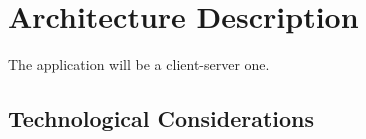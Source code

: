 \chapter{Architecture Description}
	The application will be a client-server one.


	\section{Technological Considerations}
	